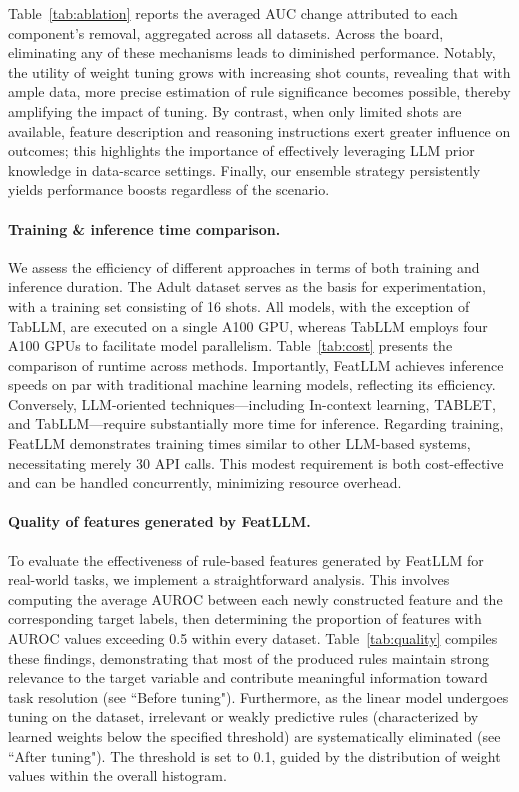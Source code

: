 Table~\ref{tab:ablation} reports the averaged AUC change attributed to each component’s removal, aggregated across all datasets. Across the board, eliminating any of these mechanisms leads to diminished performance. Notably, the utility of weight tuning grows with increasing shot counts, revealing that with ample data, more precise estimation of rule significance becomes possible, thereby amplifying the impact of tuning. By contrast, when only limited shots are available, feature description and reasoning instructions exert greater influence on outcomes; this highlights the importance of effectively leveraging LLM prior knowledge in data-scarce settings. Finally, our ensemble strategy persistently yields performance boosts regardless of the scenario.

\vspace*{-0.12in}
\paragraph{Training \& inference time comparison.} We assess the efficiency of different approaches in terms of both training and inference duration. The Adult dataset serves as the basis for experimentation, with a training set consisting of 16 shots. All models, with the exception of TabLLM, are executed on a single A100 GPU, whereas TabLLM employs four A100 GPUs to facilitate model parallelism. Table~\ref{tab:cost} presents the comparison of runtime across methods. Importantly, \textsf{FeatLLM} achieves inference speeds on par with traditional machine learning models, reflecting its efficiency. Conversely, LLM-oriented techniques—including In-context learning, TABLET, and TabLLM—require substantially more time for inference. Regarding training, \textsf{FeatLLM} demonstrates training times similar to other LLM-based systems, necessitating merely 30 API calls. This modest requirement is both cost-effective and can be handled concurrently, minimizing resource overhead.

\vspace*{-0.12in}
\paragraph{Quality of features generated by \textsf{FeatLLM}.}
To evaluate the effectiveness of rule-based features generated by \textsf{FeatLLM} for real-world tasks, we implement a straightforward analysis. This involves computing the average AUROC between each newly constructed feature and the corresponding target labels, then determining the proportion of features with AUROC values exceeding 0.5 within every dataset. Table~\ref{tab:quality} compiles these findings, demonstrating that most of the produced rules maintain strong relevance to the target variable and contribute meaningful information toward task resolution (see ``Before tuning"). Furthermore, as the linear model undergoes tuning on the dataset, irrelevant or weakly predictive rules (characterized by learned weights below the specified threshold) are systematically eliminated (see ``After tuning"). The threshold is set to 0.1, guided by the distribution of weight values within the overall histogram.

